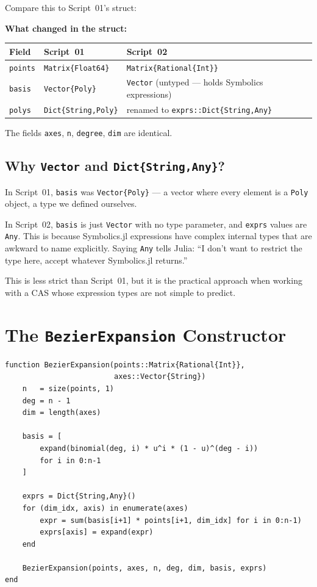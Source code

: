 \documentclass[12pt, a4paper]{article}
\newcommand{\cd}[1]{\texttt{#1}}
\begin{document}
Compare this to Script~01's struct:

\begin{diffbox}
\textbf{What changed in the struct:}

\medskip
\begin{tabular}{lll}
\toprule
Field & Script~01 & Script~02 \\
\midrule
\cd{points} & \cd{Matrix\{Float64\}} & \cd{Matrix\{Rational\{Int\}\}} \\
\cd{basis}  & \cd{Vector\{Poly\}}    & \cd{Vector} (untyped --- holds Symbolics expressions) \\
\cd{polys}  & \cd{Dict\{String,Poly\}} & renamed to \cd{exprs::Dict\{String,Any\}} \\
\bottomrule
\end{tabular}

\medskip
The fields \cd{axes}, \cd{n}, \cd{degree}, \cd{dim} are identical.
\end{diffbox}

\subsection{Why \texttt{Vector} and \texttt{Dict\{String,Any\}}?}

In Script~01, \cd{basis} was \cd{Vector\{Poly\}} --- a vector
where every element is a \cd{Poly} object, a type we defined ourselves.

In Script~02, \cd{basis} is just \cd{Vector} with no type parameter,
and \cd{exprs} values are \cd{Any}.
This is because Symbolics.jl expressions have complex internal types
that are awkward to name explicitly.
Saying \cd{Any} tells Julia: ``I don't want to restrict the type here,
accept whatever Symbolics.jl returns.''

This is less strict than Script~01, but it is the practical
approach when working with a CAS whose expression types
are not simple to predict.


\section{The \texttt{BezierExpansion} Constructor}

\begin{verbatim}
function BezierExpansion(points::Matrix{Rational{Int}},
                         axes::Vector{String})
    n   = size(points, 1)
    deg = n - 1
    dim = length(axes)

    basis = [
        expand(binomial(deg, i) * u^i * (1 - u)^(deg - i))
        for i in 0:n-1
    ]

    exprs = Dict{String,Any}()
    for (dim_idx, axis) in enumerate(axes)
        expr = sum(basis[i+1] * points[i+1, dim_idx] for i in 0:n-1)
        exprs[axis] = expand(expr)
    end

    BezierExpansion(points, axes, n, deg, dim, basis, exprs)
end
\end{verbatim}
\end{document}
